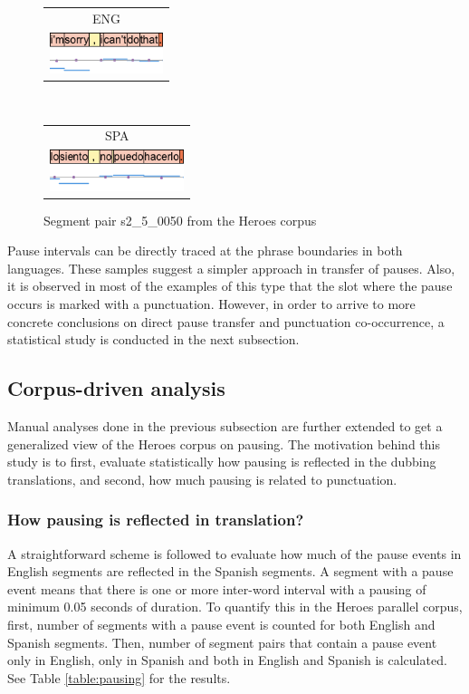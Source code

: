 \begin{figure}[h!]
\centering
\begin{minipage}[t]{0.37\textwidth}
\begin{tabular}{c}
ENG \\
\includegraphics[height=1.2cm]{img/s2_5_0050-EN.png} \\
\end{tabular}
\end{minipage}
\\
\begin{minipage}[t]{0.4\textwidth}
\begin{tabular}{c}
SPA \\
\includegraphics[height=1.2cm]{img/s2_5_0050-ES.png} \\
\end{tabular}
\end{minipage}
\caption{Segment pair s2\_5\_0050 from the Heroes corpus}
\label{figure:heroes_viz_4}
\end{figure}

Pause intervals can be directly traced at the phrase boundaries in both languages. These samples suggest a simpler approach in transfer of pauses. Also, it is observed in most of the examples of this type that the slot where the pause occurs is marked with a punctuation. However, in order to arrive to more concrete conclusions on direct pause transfer and punctuation co-occurrence, a statistical study is conducted in the next subsection. 
 
\subsection{Corpus-driven analysis}

Manual analyses done in the previous subsection are further extended to get a generalized view of the Heroes corpus on pausing. The motivation behind this study is to first, evaluate statistically how pausing is reflected in the dubbing translations, and second, how much pausing is related to punctuation. 

\subsubsection{How pausing is reflected in translation?}
A straightforward scheme is followed to evaluate how much of the pause events in English segments are reflected in the Spanish segments. A segment with a pause event means that there is one or more inter-word interval with a pausing of minimum 0.05 seconds of duration. To quantify this in the Heroes parallel corpus, first, number of segments with a pause event is counted for both English and Spanish segments. Then, number of segment pairs that contain a pause event only in English, only in Spanish and both in English and Spanish is calculated. See Table \ref{table:pausing} for the results. 

